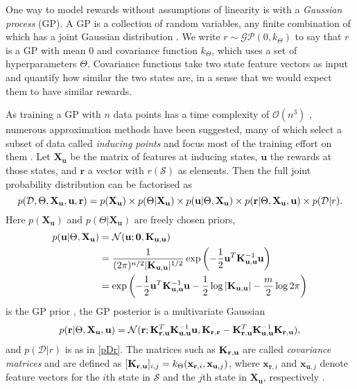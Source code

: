 \documentclass{mprop}
\theoremstyle{definition}
\begin{document}
One way to model rewards without assumptions of linearity is with a
\emph{Gaussian process} (GP). A GP is a collection of random variables, any
finite combination of which has a joint Gaussian distribution
\cite{DBLP:books/lib/RasmussenW06}. We write $r \sim \mathcal{GP}(0,
k_{\Theta})$ to say that $r$ is a GP with mean $0$ and covariance function
$k_{\Theta}$, which uses a set of hyperparameters $\Theta$. Covariance functions
take two state feature vectors as input and quantify how similar the two states
are, in a sense that we would expect them to have similar rewards.

As training a GP with $n$ data points has a time complexity of
$\mathcal{O}(n^3)$ \cite{DBLP:books/lib/RasmussenW06}, numerous approximation
methods have been suggested, many of which select a subset of data called
\emph{inducing points} and focus most of the training effort on them
\cite{DBLP:journals/corr/abs-1807-01065}. Let $\mathbf{X_u}$ be the matrix of
features at inducing states, $\mathbf{u}$ the rewards at those states, and
$\mathbf{r}$ a vector with $r(\mathcal{S})$ as elements. Then the full joint
probability distribution can be factorised as
\begin{equation} \label{full}
  p(\mathcal{D}, \Theta, \mathbf{X_u}, \mathbf{u}, \mathbf{r}) = p(\mathbf{X_u}) \times p(\Theta | \mathbf{X_u}) \times p(\mathbf{u}
  | \Theta, \mathbf{X_u}) \times p(\mathbf{r} | \Theta, \mathbf{X_u},
  \mathbf{u}) \times p(\mathcal{D} | r).
\end{equation}
Here $p(\mathbf{X_u})$ and $p(\Theta | \mathbf{X_u})$ are freely chosen priors,
\begin{align}
  p(\mathbf{u} | \Theta, \mathbf{X_u}) &= \mathcal{N}(\mathbf{u}; \mathbf{0}, \mathbf{K}_{\mathbf{u},\mathbf{u}}) \nonumber \\
                                       &= \frac{1}{(2\pi)^{n/2}|\mathbf{K}_{\mathbf{u},\mathbf{u}}|^{1/2}}\exp \left( -\frac{1}{2} \mathbf{u}^T\mathbf{K}_{\mathbf{u},\mathbf{u}}^{-1}\mathbf{u} \right) \nonumber \\
                                       &= \exp\left(-\frac{1}{2}\mathbf{u}^T\mathbf{K}_{\mathbf{u},\mathbf{u}}^{-1}\mathbf{u} - \frac{1}{2}\log|\mathbf{K}_{\mathbf{u},\mathbf{u}}| - \frac{m}{2}\log 2\pi\right) \label{eq:normal}
  \end{align} %
is the GP prior \cite{DBLP:books/lib/RasmussenW06}, the GP posterior is a
multivariate Gaussian \cite{DBLP:conf/nips/LevinePK11}
\begin{equation} \label{eq:r}
  p(\mathbf{r} | \Theta, \mathbf{X_u}, \mathbf{u}) =
  \mathcal{N}(\mathbf{r}; \mathbf{K}_{\mathbf{r},\mathbf{u}}^T\mathbf{K}_{\mathbf{u},\mathbf{u}}^{-1}\mathbf{u}, \mathbf{K}_{\mathbf{r},\mathbf{r}} - \mathbf{K}_{\mathbf{r},\mathbf{u}}^T\mathbf{K}_{\mathbf{u},\mathbf{u}}^{-1}\mathbf{K}_{\mathbf{r},\mathbf{u}}),
\end{equation}
and $p(\mathcal{D} | r)$ is as in \eqref{pDr}. The matrices such as
$\mathbf{K}_{\mathbf{r},\mathbf{u}}$ are called \emph{covariance matrices} and are defined as
$[\mathbf{K}_{\mathbf{r},\mathbf{u}}]_{i,j} = k_\Theta(\mathbf{x}_{\mathbf{r},i}, \mathbf{x}_{\mathbf{u},j})$,
where $\mathbf{x}_{\mathbf{r},i}$ and $\mathbf{x}_{\mathbf{u},j}$ denote feature
vectors for the $i$th state in $\mathcal{S}$ and the $j$th state in
$\mathbf{X_u}$, respectively \cite{DBLP:conf/uai/JinDAS17}.
\end{document}
